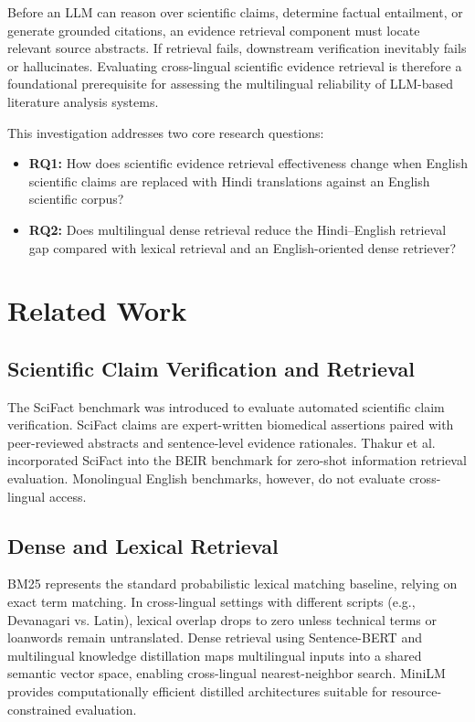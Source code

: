 \documentclass[11pt,a4paper]{article}
\begin{document}
Before an LLM can reason over scientific claims, determine factual entailment, or generate grounded citations, an evidence retrieval component must locate relevant source abstracts. If retrieval fails, downstream verification inevitably fails or hallucinates. Evaluating cross-lingual scientific evidence retrieval is therefore a foundational prerequisite for assessing the multilingual reliability of LLM-based literature analysis systems.

This investigation addresses two core research questions:
\begin{itemize}
    \item \textbf{RQ1:} How does scientific evidence retrieval effectiveness change when English scientific claims are replaced with Hindi translations against an English scientific corpus?
    \item \textbf{RQ2:} Does multilingual dense retrieval reduce the Hindi--English retrieval gap compared with lexical retrieval and an English-oriented dense retriever?
\end{itemize}

\section{Related Work}
\subsection{Scientific Claim Verification and Retrieval}
The SciFact benchmark \cite{wadden2020fact} was introduced to evaluate automated scientific claim verification. SciFact claims are expert-written biomedical assertions paired with peer-reviewed abstracts and sentence-level evidence rationales. Thakur et al. \cite{thakur2021beir} incorporated SciFact into the BEIR benchmark for zero-shot information retrieval evaluation. Monolingual English benchmarks, however, do not evaluate cross-lingual access.

\subsection{Dense and Lexical Retrieval}
BM25 \cite{robertson2009bm25} represents the standard probabilistic lexical matching baseline, relying on exact term matching. In cross-lingual settings with different scripts (e.g., Devanagari vs. Latin), lexical overlap drops to zero unless technical terms or loanwords remain untranslated. Dense retrieval using Sentence-BERT \cite{reimers2019sentence} and multilingual knowledge distillation \cite{reimers2020multilingual} maps multilingual inputs into a shared semantic vector space, enabling cross-lingual nearest-neighbor search. MiniLM \cite{wang2020minilm} provides computationally efficient distilled architectures suitable for resource-constrained evaluation.
\end{document}
